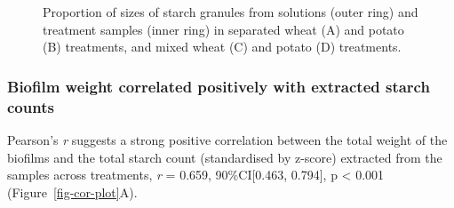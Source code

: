 \documentclass[
  b5paper,
]{book}
\begin{document}
\begin{figure}[H]


\caption{\label{fig-ratio-plots}Proportion of sizes of starch granules
from solutions (outer ring) and treatment samples (inner ring) in
separated wheat (A) and potato (B) treatments, and mixed wheat (C) and
potato (D) treatments.}

\end{figure}%

\subsubsection{Biofilm weight correlated positively with extracted
starch
counts}\label{biofilm-weight-correlated-positively-with-extracted-starch-counts}

Pearson's \emph{r} suggests a strong positive correlation between the
total weight of the biofilms and the total starch count (standardised by
z-score) extracted from the samples across treatments, \emph{r} = 0.659,
90\%CI{[}0.463, 0.794{]}, p \textless{} 0.001
(Figure~\ref{fig-cor-plot}A).
\end{document}
